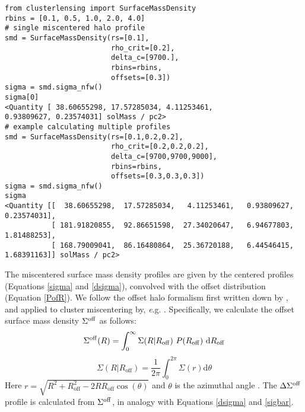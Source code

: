 \documentclass{emulateapj}
\begin{document}
\begin{lstlisting}
from clusterlensing import SurfaceMassDensity
rbins = [0.1, 0.5, 1.0, 2.0, 4.0]
# single miscentered halo profile
smd = SurfaceMassDensity(rs=[0.1], 
                         rho_crit=[0.2], 
                         delta_c=[9700.], 
                         rbins=rbins,
                         offsets=[0.3])
sigma = smd.sigma_nfw()
sigma[0]
<Quantity [ 38.60655298, 17.57285034, 4.11253461, 
0.93809627, 0.23574031] solMass / pc2>
# example calculating multiple profiles
smd = SurfaceMassDensity(rs=[0.1,0.2,0.2], 
                         rho_crit=[0.2,0.2,0.2], 
                         delta_c=[9700,9700,9000], 
                         rbins=rbins, 
                         offsets=[0.3,0.3,0.3])
sigma = smd.sigma_nfw()
sigma 
<Quantity [[  38.60655298,  17.57285034,   4.11253461,   0.93809627,   0.23574031],
           [ 181.91820855,  92.86651598,  27.34020647,   6.94677803,  1.81488253],
           [ 168.79009041,  86.16480864,  25.36720188,   6.44546415,  1.68391163]] solMass / pc2>
\end{lstlisting}

The miscentered surface mass density profiles are given by the centered profiles (Equations \ref{sigma} and \ref{dsigma}), convolved with the offset distribution (Equation \ref{PofR}). We follow the offset halo formalism first written down by \citet{Yang06}, and applied to cluster miscentering by, {\textit e.g.} \citet{Johnston07, George12, Ford14, Ford15, Simet16}. Specifically, we calculate the offset surface mass density $\Sigma^{\rm off}$ as follows:
\begin{equation}
\Sigma^{\rm off}(R) = \int_{0}^{\infty} \Sigma(R | R_{\rm off})\ P(R_{\rm off})\ {\rm d}R_{\rm off}
\end{equation}
\begin{equation}
\Sigma(R|R_{\mathrm{off}})=\frac{1}{2\pi}\int_{0}^{2\pi}\Sigma(r) \mathrm{d}\theta
\end{equation}
Here $r = \sqrt{R^2+R_{\mathrm{off}}^2-2RR_{\mathrm{off}}\cos(\theta)}$ and $\theta$ is the azimuthal angle \citep{Yang06}. The $\Delta\Sigma^{\rm off}$ profile is calculated from $\Sigma^{\rm off}$, in analogy with Equations \ref{dsigma} and \ref{sigbar}.
\end{document}
